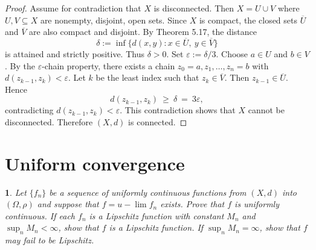 \documentclass[12pt, a4paper]{report}
\theoremstyle{spaced}
\newtheorem{exercise}{}
\newcommand{\setexercise}[1]{\setcounter{exercise}{#1-1}}
\begin{document}
\begin{proof}
	Assume for contradiction that $X$ is disconnected. Then
	$X=U\cup V$ where $U,V\subseteq X$ are nonempty, disjoint, open sets.
	Since $X$ is compact, the closed sets $\overline{U}$ and $\overline{V}$
	are also compact and disjoint. By Theorem 5.17, the distance
	\[
		\delta := \inf\{d(x,y): x\in \overline{U},\ y\in \overline{V}\}
	\]
	is attained and strictly positive. Thus $\delta>0$.
	Set $\varepsilon := \delta/3$. Choose $a\in U$ and $b\in V$.
	By the $\varepsilon$-chain property, there exists a chain
	$z_0=a, z_1, \dots, z_n=b$ with $d(z_{k-1},z_k)<\varepsilon$.
	Let $k$ be the least index such that $z_k \in \overline{V}$.
	Then $z_{k-1}\in \overline{U}$. Hence
	\[
		d(z_{k-1},z_k)\ \geq\ \delta \ =\ 3\varepsilon,
	\]
	contradicting $d(z_{k-1},z_k)<\varepsilon$.
	This contradiction shows that $X$ cannot be disconnected.
	Therefore $(X,d)$ is connected.
\end{proof}

\section{Uniform convergence}

\setexercise{1}
\begin{exercise}
	Let $\{f_n\}$ be a sequence of uniformly continuous functions from $(X,d)$ into $(\Omega,\rho)$
	and suppose that $f = u\!-\!\lim f_n$ exists. Prove that $f$ is uniformly continuous.
	If each $f_n$ is a Lipschitz function with constant $M_n$ and $\sup_n M_n < \infty$,
	show that $f$ is a Lipschitz function. If $\sup_n M_n = \infty$, show that $f$ may fail to be Lipschitz.
\end{exercise}
\end{document}
